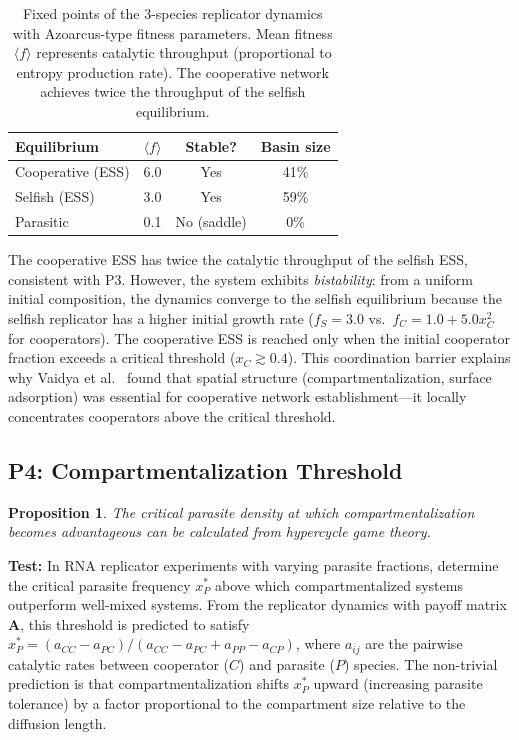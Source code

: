 \documentclass[12pt,a4paper]{article}
\newtheorem{proposition}{Proposition}
\theoremstyle{remark}
\begin{document}
\begin{table}[ht]
\centering
\caption{Fixed points of the 3-species replicator dynamics with Azoarcus-type fitness parameters. Mean fitness $\langle f \rangle$ represents catalytic throughput (proportional to entropy production rate). The cooperative network achieves twice the throughput of the selfish equilibrium.}
\label{tab:replicator-fps}
\begin{tabular}{lccc}
\toprule
\textbf{Equilibrium} & $\langle f \rangle$ & \textbf{Stable?} & \textbf{Basin size} \\
\midrule
Cooperative (ESS) & 6.0 & Yes & 41\% \\
Selfish (ESS) & 3.0 & Yes & 59\% \\
Parasitic & 0.1 & No (saddle) & 0\% \\
\bottomrule
\end{tabular}
\end{table}

The cooperative ESS has twice the catalytic throughput of the selfish ESS, consistent with P3. However, the system exhibits \emph{bistability}: from a uniform initial composition, the dynamics converge to the selfish equilibrium because the selfish replicator has a higher initial growth rate ($f_S = 3.0$ vs.\ $f_C = 1.0 + 5.0 x_C^2$ for cooperators). The cooperative ESS is reached only when the initial cooperator fraction exceeds a critical threshold ($x_C \gtrsim 0.4$). This coordination barrier explains why Vaidya et al.\ \citep{AzoarcusPNAS} found that spatial structure (compartmentalization, surface adsorption) was essential for cooperative network establishment---it locally concentrates cooperators above the critical threshold.

\subsection{P4: Compartmentalization Threshold}

\begin{proposition}
The critical parasite density at which compartmentalization becomes advantageous can be calculated from hypercycle game theory.
\end{proposition}

\textbf{Test:} In RNA replicator experiments with varying parasite fractions, determine the critical parasite frequency $x_P^*$ above which compartmentalized systems outperform well-mixed systems. From the replicator dynamics with payoff matrix $\mathbf{A}$, this threshold is predicted to satisfy $x_P^* = (a_{CC} - a_{PC})/(a_{CC} - a_{PC} + a_{PP} - a_{CP})$, where $a_{ij}$ are the pairwise catalytic rates between cooperator ($C$) and parasite ($P$) species. The non-trivial prediction is that compartmentalization shifts $x_P^*$ upward (increasing parasite tolerance) by a factor proportional to the compartment size relative to the diffusion length.
\end{document}

